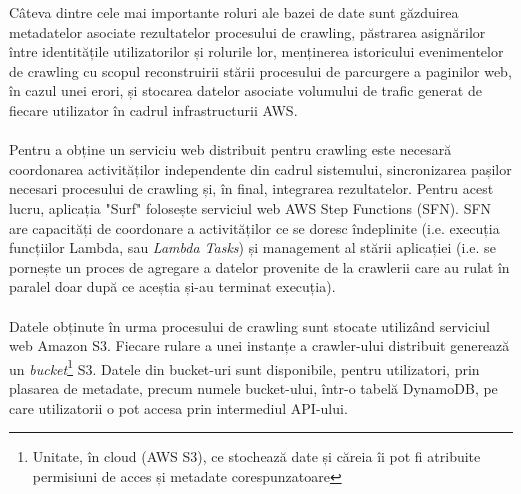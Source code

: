 \noindent
Câteva dintre cele mai importante roluri ale bazei de date sunt găzduirea metadatelor asociate rezultatelor procesului de crawling, păstrarea asignărilor între identitățile utilizatorilor și rolurile lor, menținerea istoricului evenimentelor de crawling cu scopul reconstruirii stării procesului de parcurgere a paginilor web, în cazul unei erori, și stocarea datelor asociate volumului de trafic generat de fiecare utilizator în cadrul infrastructurii AWS.
\\
\\
Pentru a obține un serviciu web distribuit pentru crawling este necesară coordonarea activităților independente din cadrul sistemului, sincronizarea pașilor necesari procesului de crawling și, în final, integrarea rezultatelor. Pentru acest lucru, aplicația "Surf" folosește serviciul web AWS Step Functions (SFN). SFN  are capacități de coordonare a activităților ce se doresc îndeplinite (i.e. execuția funcțiilor Lambda, sau \emph{Lambda Tasks}) și management al stării aplicației (i.e. se pornește un proces de agregare a datelor provenite de la crawlerii care au rulat în paralel doar după ce aceștia și-au terminat execuția).
\\
\\
Datele obținute în urma procesului de crawling sunt stocate utilizând serviciul web Amazon S3. Fiecare rulare a unei instanțe a crawler-ului distribuit generează un \emph{bucket}\footnote{Unitate, în cloud (AWS S3), ce stochează date și căreia îi pot fi atribuite permisiuni de acces și metadate corespunzatoare} S3. Datele din bucket-uri sunt disponibile, pentru utilizatori, prin plasarea de metadate, precum numele bucket-ului, într-o tabelă DynamoDB, pe care utilizatorii o pot accesa prin intermediul API-ului.

